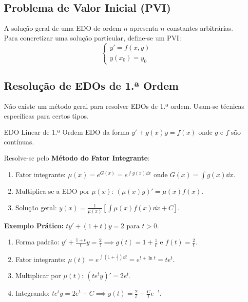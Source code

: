 \documentclass[11pt,a4paper]{article}
\newcommand{\dx}{\dd x}
\begin{document}
\newpage

\subsection{Problema de Valor Inicial (PVI)}
A solução geral de uma EDO de ordem $n$ apresenta $n$ constantes arbitrárias. \\ Para concretizar uma solução particular, define-se um PVI:
\[
  \begin{cases}
    y' = f(x, y) \\
    y(x_0) = y_0
  \end{cases}
\]

\subsection{Resolução de EDOs de 1.ª Ordem}

Não existe um método geral para resolver EDOs de 1.ª ordem. Usam-se técnicas específicas para certos tipos. \\

\noindent\begin{theorembox}{EDO Linear de 1.ª Ordem}
  EDO da forma $y' + g(x) y = f(x)$ onde $g$ e $f$ são contínuas.
  
  \vspace {1em}

  Resolve-se pelo \textbf{Método do Fator Integrante}:
  \begin{enumerate}
    \item Fator integrante: $\mu(x) = e^{G(x)} = e^{\int g(x) \dx}$ onde $G(x) = \int g(x) \dx$.
    \item Multiplica-se a EDO por $\mu(x)$: $(\mu(x) y)' = \mu(x) f(x)$.
    \item Solução geral: $y(x) = \frac{1}{\mu(x)} \left[ \int \mu(x) f(x) \dx + C \right]$.
  \end{enumerate}

  \vspace {1em}

  \textbf{Exemplo Prático:} $t y' + (1+t)y = 2$ para $t > 0$.
  \begin{enumerate}
    \item Forma padrão: $y' + \frac{1+t}{t}y = \frac{2}{t} \implies g(t) = 1 + \frac{1}{t}$ e $f(t) = \frac{2}{t}$.
    \item Fator integrante: $\mu(t) = e^{\int \left(1 + \frac{1}{t}\right) \dd t} = e^{t + \ln t} = t e^t$.
    \item Multiplicar por $\mu(t)$: $(t e^t y)' = 2 e^t$.
    \item Integrando: $t e^t y = 2 e^t + C \implies y(t) = \frac{2}{t} + \frac{C}{t} e^{-t}$.
  \end{enumerate}
\end{theorembox}
\end{document}

